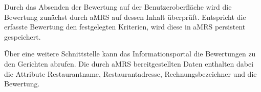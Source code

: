 Durch das Absenden der Bewertung auf der Benutzeroberfläche wird die Bewertung zunächst durch \ac{aMRS} auf dessen Inhalt überprüft.
Entspricht die erfasste Bewertung den festgelegten Kriterien, wird diese in \ac{aMRS} persistent gespeichert.


Über eine weitere Schnittstelle kann das Informationsportal die Bewertungen zu den Gerichten abrufen.
Die durch \ac{aMRS} bereitgestellten Daten enthalten dabei die Attribute Restaurantname, Restaurantadresse, Rechnungsbezeichner und die Bewertung.
